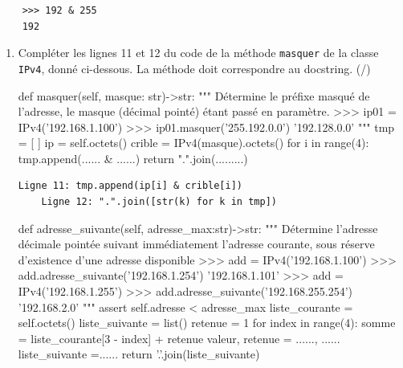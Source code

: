    \begin{verbatim}
    >>> 192 & 255 
    192
   \end{verbatim}

   \begin{enumerate}[resume=monDS]
    \item Compléter les lignes 11 et 12 du code de la méthode \verb|masquer| de la classe \verb|IPv4|, donné ci-dessous. La méthode doit correspondre au docstring. (/)
    
\begin{CodePythontexAlt}[TaillePolice=\large, Largeur=1\linewidth,Centre,Lignes=true,PremLigne=1]{}
    def masquer(self, masque: str)->str:
        """ Détermine le préfixe masqué de l'adresse, 
        le masque (décimal pointé) étant passé en paramètre. 
        >>> ip01 = IPv4('192.168.1.100')
        >>> ip01.masquer('255.192.0.0')
        '192.128.0.0'        """
        tmp = [ ]
        ip = self.octets()
        crible = IPv4(masque).octets()
        for i in range(4):
            tmp.append(...... & ......)
        return ".".join(.........)
   \end{CodePythontexAlt}

   \begin{blocvisible}[height=3]
        \begin{lstlisting}[frame=none, numbers=none]
    Ligne 11: tmp.append(ip[i] & crible[i])
    Ligne 12: ".".join([str(k) for k in tmp])        
    \end{lstlisting}
    \end{blocvisible}


        \begin{CodePythontexAlt}[TaillePolice=\large, Largeur=1\linewidth,Centre,Lignes=true,PremLigne=1]{}
    def adresse_suivante(self, adresse_max:str)->str:
        """ Détermine l'adresse décimale pointée suivant immédiatement 
        l'adresse courante, sous réserve d'existence d'une adresse disponible 
        >>> add = IPv4('192.168.1.100')
        >>> add.adresse_suivante('192.168.1.254')
        '192.168.1.101'
        >>> add = IPv4('192.168.1.255')
        >>> add.adresse_suivante('192.168.255.254')
        '192.168.2.0'        """
        assert self.adresse < adresse_max
        liste_courante = self.octets()
        liste_suivante = list()
        retenue = 1
        for index in range(4):
            somme = liste_courante[3 - index] + retenue
            valeur, retenue = ......, ......
            liste_suivante =......
        return '.'.join(liste_suivante)
   \end{CodePythontexAlt}
        

\end{enumerate}
